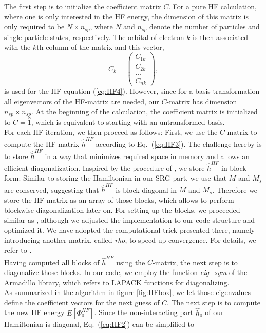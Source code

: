 The first step is to initialize the coefficient matrix $C$. For a pure HF calculation, where one is only interested in the HF energy, the dimension of this matrix is only required to be $N\times n_{sp}$, where $N$ and $n_{sp}$ denote the number of particles and single-particle states, respectively. The orbital of electron $k$ is then associated with the $k$th column of the matrix and this vector,
\[
C_k = \left(\begin{array}{c}
C_{1k}\\
C_{2k}\\
\dots\\
C_{nk}
\end{array}\right),
\]
is used for the HF equation (\ref{eq:HF4}).
However, since for a basis transformation all eigenvectors of the HF-matrix are needed, our $C$-matrix has dimension $n_{sp}\times n_{sp}$. At the beginning of the calculation, the coefficient matrix is initialized to $C=\hat{1}$, which is equivalent to starting with an untransformed basis.\\
For each HF iteration, we then proceed as follows:
First, we use the $C$-matrix to compute the HF-matrix $\hat{h}^{HF}$ according to Eq.~(\ref{eq:HF3}). The challenge hereby is to store $\hat{h}^{HF}$ in a way that minimizes required space in memory and allows an efficient diagonalization. Inspired by the procedure of \cite{Marte,Christoffer}, we store $\hat{h}^{HF}$ in block-form:
Similar to storing the Hamiltonian in our SRG part, we use that $M$ and $M_s$ are conserved, suggesting that $\hat{h}^{HF}$ is block-diagonal in $M$ and $M_s$. Therefore we store the HF-matrix as an array of those blocks, which allows to perform blockwise diagonalization later on. For setting up the blocks, we proceeded similar as \cite{Marte}, although we adjusted the implementation to our code structure and optimized it. We have adopted the  computational trick presented there, namely introducing another matrix, called \textit{rho}, to speed up convergence. For details, we refer to \cite{Marte}.\\
Having computed all blocks of $\hat{h}^{HF}$ using the $C$-matrix, the next step is to diagonalize those blocks. In our code, we employ the function \textit{eig\_sym} of the Armadillo library, which refers to LAPACK functions for diagonalizing.\\
As summarized in the algorithm in figure \ref{fig:HFbox}, we let 
those eigenvalues define the coefficient vectors for the next guess of $C$.  The next step is to
compute the new HF energy $E \left[ \Phi_0^{HF}\right]$. Since the non-interacting part $\hat{h}_0$ of our Hamiltonian is diagonal, Eq.~(\ref{eq:HF2}) can be simplified to
